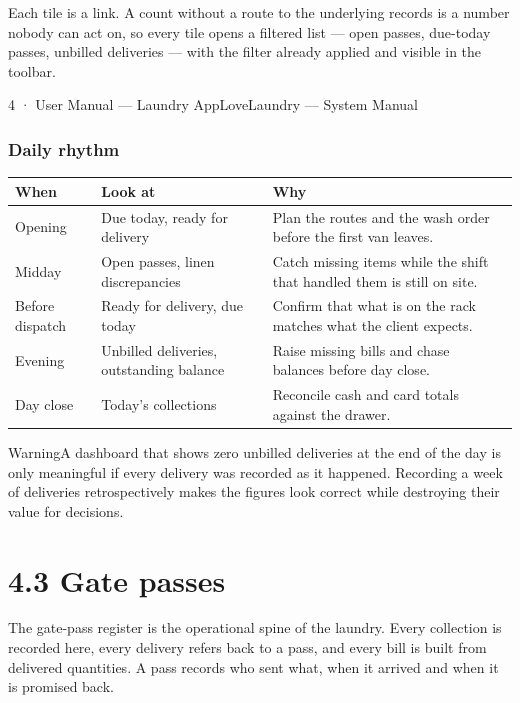 \documentclass[11pt,a4paper,oneside]{book}
\begin{document}
Each tile is a link. A count without a route to the underlying records is a number nobody can act on, so every tile opens a filtered list — open passes, due-today passes, unbilled deliveries — with the filter already applied and visible in the toolbar.

4 · User Manual — Laundry AppLoveLaundry — System Manual

\subsubsection*{Daily rhythm}
\begin{center}\small
\begin{tabularx}{\linewidth}{|X|X|X|}
\hline
\rowcolor{lightgrey}
\textbf{When} & \textbf{Look at} & \textbf{Why} \\ \hline
Opening & Due today, ready for delivery & Plan the routes and the wash order before the first van leaves. \\ \hline
Midday & Open passes, linen discrepancies & Catch missing items while the shift that handled them is still on site. \\ \hline
Before dispatch & Ready for delivery, due today & Confirm that what is on the rack matches what the client expects. \\ \hline
Evening & Unbilled deliveries, outstanding balance & Raise missing bills and chase balances before day close. \\ \hline
Day close & Today's collections & Reconcile cash and card totals against the drawer. \\ \hline
\end{tabularx}
\end{center}
\begin{notebox}WarningA dashboard that shows zero unbilled deliveries at the end of the day is only meaningful if every delivery was recorded as it happened. Recording a week of deliveries retrospectively makes the figures look correct while destroying their value for decisions.\end{notebox}
\section{4.3 Gate passes}
The gate-pass register is the operational spine of the laundry. Every collection is recorded here, every delivery refers back to a pass, and every bill is built from delivered quantities. A pass records who sent what, when it arrived and when it is promised back.
\end{document}

